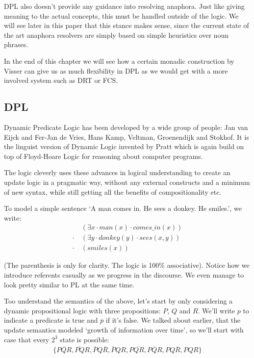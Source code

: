 \documentclass[12pt]{article}
\begin{document}
\begin{itemize}
DPL also doesn't provide any guidance into resolving anaphora. Just like giving meaning to the actual concepts, this must be handled outside of the logic. We will see later in this paper that this stance makes sense, since the current state of the art anaphora resolvers are simply based on simple heuristics over noun phrases.

In the end of this chapter we will see how a certain monadic construction by Visser can give us as much flexibility in DPL as we would get with a more involved system such as DRT or FCS.
\end{itemize}

\subsection{DPL}

Dynamic Predicate Logic has been developed by a wide group of people: Jan van Eijck and Fer-Jan de Vries\cite{eijck1992dynamic}, Hans Kamp, Veltman, Groenendijk and Stokhof. It is the linguist version of Dynamic Logic invented by Pratt\cite{pratt1976semantical} which is again build on top of Floyd-Hoare Logic for reasoning about computer programs.

The logic cleverly uses these advances in logical understanding to create an update logic in a pragmatic way, without any external constructs and a minimum of new syntax, while still getting all the benefits of compositionality etc.

To model a simple sentence `A man comes in. He sees a donkey. He smiles.', we write:
%
\begin{align}
&(\exists x \cdot man(x) \cdot comes\_in(x)) \nonumber\\
\cdot\ &(\exists y \cdot donkey(y) \cdot sees(x,y)) \nonumber\\
\cdot\ &(smiles(x)) \nonumber
\end{align}

(The parenthesis is only for clarity. The logic is 100\% associative). Notice how we introduce referents casually as we progress in the discourse. We even manage to look pretty similar to PL at the same time. 

Too understand the semantics of the above, let's start by only considering a dynamic propositional logic with three propositions: $P$, $Q$ and $R$. We'll write $p$ to indicate a predicate is true and $\overline{p}$ if it's false. We talked about earlier, that the update semantics modeled `growth of information over time', so we'll start with case that every $2^3$ state is possible:
%
\begin{align}
\{\overline{PQR}, \overline{PQ}R, \overline{P}Q\overline{R}, \overline{P}QR, P\overline{QR}, P\overline{Q}R, PQ\overline{R}, PQR\} \label{dpl_all_states}
\end{align}
\end{document}
